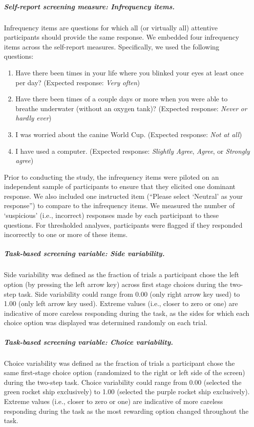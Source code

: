 \documentclass[a4paper,notitlepage,12pt]{article}
\begin{document}
\subparagraph{Self-report screening measure: Infrequency items.} Infrequency items are questions for which all (or virtually all) attentive participants should provide the same response. We embedded four infrequency items across the self-report measures. Specifically, we used the following questions:

\begin{enumerate}
  \item Have there been times in your life where you blinked your eyes at least once per day? (Expected response: \textit{Very often})
  \item Have there been times of a couple days or more when you were able to breathe underwater (without an oxygen tank)? (Expected response: \textit{Never or hardly ever})
  \item I was worried about the canine World Cup. (Expected response: \textit{Not at all})
  \item I have used a computer. (Expected response: \textit{Slightly Agree}, \textit{Agree}, or \textit{Strongly agree})
\end{enumerate}

Prior to conducting the study, the infrequency items were piloted on an independent sample of participants to ensure that they elicited one dominant response. We also included one instructed item (``Please select `Neutral' as your response'') to compare to the infrequency items. We measured the number of `suspicious' (i.e., incorrect) responses made by each participant to these questions. For thresholded analyses, participants were flagged if they responded incorrectly to one or more of these items. 

\subparagraph{Task-based screening variable: Side variability.} Side variability was defined as the fraction of trials a participant chose the left option (by pressing the left arrow key) across first stage choices during the two-step task. Side variability could range from 0.00 (only right arrow key used) to 1.00 (only left arrow key used). Extreme values (i.e., closer to zero or one) are indicative of more careless responding during the task, as the sides for which each choice option was displayed was determined randomly on each trial.  

\subparagraph{Task-based screening variable: Choice variability.} Choice variability was defined as the fraction of trials a participant chose the same first-stage choice option (randomized to the right or left side of the screen) during the two-step task. Choice variability could range from 0.00 (selected the green rocket ship exclusively) to 1.00 (selected the purple rocket ship exclusively). Extreme values (i.e., closer to zero or one) are indicative of more careless responding during the task as the most rewarding option changed throughout the task.  
\end{document}
